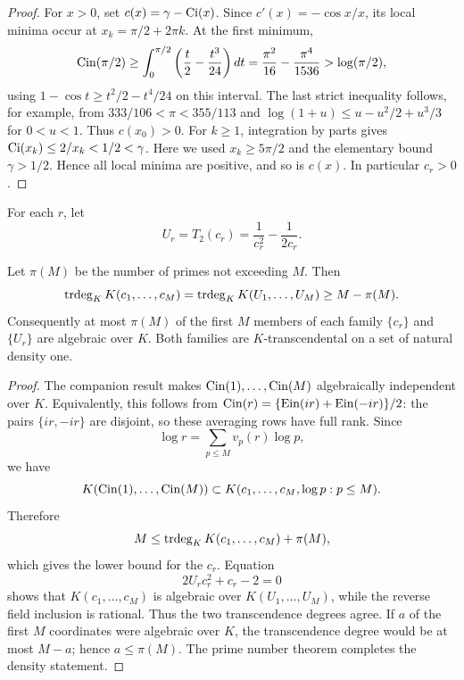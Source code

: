 \begin{proof}
For \(x>0\), set \(c(x)=\gamma-\operatorname{Ci}(x)\).  Since
\(c'(x)=-\cos x/x\), its local minima occur at
\(x_k=\pi/2+2\pi k\).  At the first minimum,
\[
 \operatorname{Cin}(\pi/2)
 \ge \int_0^{\pi/2}\left(\frac t2-\frac{t^3}{24}\right)dt
 =\frac{\pi^2}{16}-\frac{\pi^4}{1536}
 >\log(\pi/2),
\]
using \(1-\cos t\ge t^2/2-t^4/24\) on this interval.  The last strict
inequality follows, for example, from
\(333/106<\pi<355/113\) and
\(\log(1+u)\le u-u^2/2+u^3/3\) for \(0<u<1\).
Thus
\(c(x_0)>0\).  For \(k\ge1\), integration by parts gives
\(\operatorname{Ci}(x_k)\le2/x_k<1/2<\gamma\).  Here we used
\(x_k\ge5\pi/2\) and the elementary bound \(\gamma>1/2\).
Hence all local minima are positive, and so is
\(c(x)\).  In particular \(c_r>0\).
\end{proof}

For each \(r\), let
\begin{equation}\label{eq:Ur}
 U_r=T_2(c_r)=\frac1{c_r^2}-\frac1{2c_r}.
\end{equation}

\begin{theorem}
\label{thm:prime-defect}
Let \(\pi(M)\) be the number of primes not exceeding \(M\).  Then
\begin{equation}\label{eq:prime-defect-trdeg}
 \operatorname{trdeg}_KK(c_1,\ldots,c_M)
 =\operatorname{trdeg}_KK(U_1,\ldots,U_M)
 \ge M-\pi(M).
\end{equation}
Consequently at most \(\pi(M)\) of the first \(M\) members of each family
\(\{c_r\}\) and \(\{U_r\}\) are algebraic over \(K\).  Both families are
\(K\)-transcendental on a set of natural density one.
\end{theorem}

\begin{proof}
The companion result \cite[Cor.~5.5]{KEIO2026I} makes
\(\operatorname{Cin}(1),\ldots,\operatorname{Cin}(M)\) algebraically independent over \(K\).
Equivalently, this follows from
\(\operatorname{Cin}(r)=\{\operatorname{Ein}(ir)+\operatorname{Ein}(-ir)\}/2\): the pairs
\(\{ir,-ir\}\) are disjoint, so these averaging rows have full rank.
Since
\[
 \log r=\sum_{p\le M}v_p(r)\log p,
\]
we have
\[
 K(\operatorname{Cin}(1),\ldots,\operatorname{Cin}(M))
 \subset K(c_1,\ldots,c_M,\log p:p\le M).
\]
Therefore
\[
 M\le \operatorname{trdeg}_KK(c_1,\ldots,c_M)+\pi(M),
\]
which gives the lower bound for the \(c_r\).  Equation
\[
 2U_rc_r^2+c_r-2=0
\]
shows that \(K(c_1,\ldots,c_M)\) is algebraic over
\(K(U_1,\ldots,U_M)\), while the reverse field inclusion is rational.
Thus the two transcendence degrees agree.  If \(a\) of the first \(M\)
coordinates were algebraic over \(K\), the transcendence degree would be at
most \(M-a\); hence \(a\le\pi(M)\).  The prime number theorem completes the
density statement.
\end{proof}


